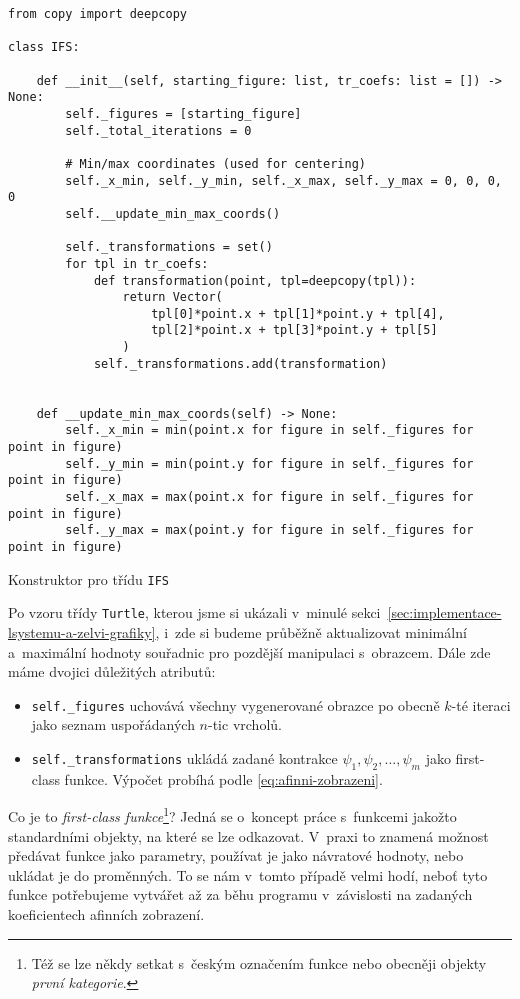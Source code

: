 \begin{program}[h]
\begin{lstlisting}[style=python]
from copy import deepcopy

class IFS:

    def __init__(self, starting_figure: list, tr_coefs: list = []) -> None:
        self._figures = [starting_figure]
        self._total_iterations = 0

        # Min/max coordinates (used for centering)
        self._x_min, self._y_min, self._x_max, self._y_max = 0, 0, 0, 0
        self.__update_min_max_coords()

        self._transformations = set()
        for tpl in tr_coefs:
            def transformation(point, tpl=deepcopy(tpl)):
                return Vector(
                    tpl[0]*point.x + tpl[1]*point.y + tpl[4],
                    tpl[2]*point.x + tpl[3]*point.y + tpl[5]
                )
            self._transformations.add(transformation)
    
    
    def __update_min_max_coords(self) -> None:
        self._x_min = min(point.x for figure in self._figures for point in figure)
        self._y_min = min(point.y for figure in self._figures for point in figure)
        self._x_max = max(point.x for figure in self._figures for point in figure)
        self._y_max = max(point.y for figure in self._figures for point in figure)
\end{lstlisting}
    \caption{Konstruktor pro třídu \texttt{IFS}}
    \label{prog:konstruktor-ifs}
\end{program}
Po vzoru třídy \texttt{Turtle}, kterou jsme si ukázali v~minulé sekci~\ref{sec:implementace-lsystemu-a-zelvi-grafiky}, i~zde si budeme průběžně aktualizovat minimální a~maximální hodnoty souřadnic pro pozdější manipulaci s~obrazcem. Dále zde máme dvojici důležitých atributů:
\begin{itemize}
    \item \texttt{self.\_figures} uchovává všechny vygenerované obrazce po obecně $k$-té iteraci jako seznam uspořádaných $n$-tic vrcholů.
    \item \texttt{self.\_transformations} ukládá zadané kontrakce $\psi_1,\psi_2,\ldots,\psi_m$ jako first-class funkce. Výpočet probíhá podle \eqref{eq:afinni-zobrazeni}.
\end{itemize}
Co je to \emph{first-class funkce}\footnote{Též se lze někdy setkat s~českým označením funkce nebo obecněji objekty \emph{první kategorie}.}? Jedná se o~koncept práce s~funkcemi jakožto standardními objekty, na které se lze odkazovat. V~praxi to znamená možnost předávat funkce jako parametry, používat je jako návratové hodnoty, nebo ukládat je do proměnných. To se nám v~tomto případě velmi hodí, neboť tyto funkce potřebujeme vytvářet až za běhu programu v~závislosti na zadaných koeficientech afinních zobrazení.

